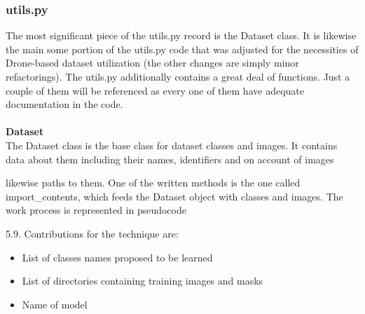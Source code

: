 \subsubsection{utils.py}
The most significant piece of the utils.py record is the Dataset class. It is likewise the main 
some portion of the utils.py code that was adjusted for the necessities of Drone-based dataset utilization 
(the other changes are simply minor refactorings). The utils.py additionally contains a great deal of functions. Just a couple of them will be referenced 
as every one of them have adequate documentation in the code.
\\
\\
\textbf{Dataset}
\\
The Dataset class is the base class for dataset classes and images. It contains data about them including their names, identifiers and on account of images

likewise paths to them. One of the written methods is the one called import\_contents, which feeds the Dataset object with classes and images. The work process is represented in pseudocode 

5.9. Contributions for the technique are: 
\begin{itemize}
  \item List of classes names proposed to be learned

  \item List of directories containing training images and masks 
  \item Name of model
\end{itemize}

